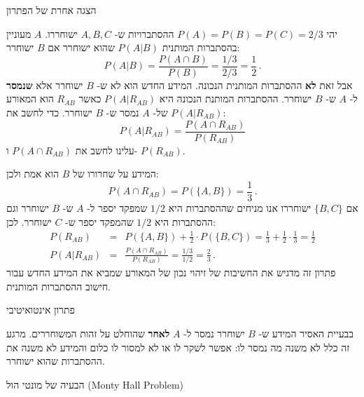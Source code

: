 \documentclass[12pt,a4paper,leqno]{article}
\renewcommand*{\L}[1]{\textenglish{#1}}
\newcommand*{\disfrac}[2]{\displaystyle\frac{#1}{#2}}
\begin{document}
{\bigskip\Large
הצגה אחרת של הפתרון}


יהי 
$P(A)= P(B)=P(C)=2/3$
ההסתברויות ש-%
$A,B,C$
ישוחררו.
$A$
מעוניין בהסתברות המותנית 
$P(A|B)$
שהוא ישוחרר אם 
$B$
ישוחרר:
\[
P(A|B) = \frac{P(A\cap B)}{P(B)} = \frac{1/3}{2/3}=\frac{1}{2}\,.
\]
אבל זאת 
\textbf{לא}
ההסתברות המותנית הנכונה. המידע החדש הוא לא ש-%
$B$
ישוחרר אלא
\textbf{שנמסר}
ל-%
$A$
ש-%
$B$
ישוחרר. ההסתברות המותנת הנכונה היא
$P(A|R_{AB})$
כאשר
$R_{AB}$
הוא המאורע של-%
$A$
נמסר ש-%
$B$
ישוחרר. כדי לחשב את
$P(A|R_{AB})$:
\[
P(A|R_{AB}) = \frac{P(A\cap R_{AB})}{P(R_{AB})}
\]
עלינו לחשב את
$P(A\cap R_{AB})$
ו-%
$P(R_{AB})$.

המידע על שחרורו של
$B$
הוא אמת ולכן:
\[
P(A\cap R_{AB})=P(\{A,B\})=\disfrac{1}{3}\,.
\]
אם 
$\{B,C\}$
ישוחררו אנו מניחים שההסתברות היא
$1/2$
שמפקד יספר ל-%
$A$
ש-%
$B$
ישוחרר וגם ההסתברות היא
$1/2$
שהמפקד יספר ש-%
$C$
ישוחרר. לכן:
\begin{eqnarray*}
P(R_{AB})&=&P(\{A,B\})+\disfrac{1}{2}\cdot P(\{B,C\})=\disfrac{1}{3}+\disfrac{1}{2}\cdot \disfrac{1}{3}=\disfrac{1}{2}\\
P(A|R_{AB}) &=& \frac{P(A\cap R_{AB})}{P(R_{AB})} = \disfrac{1/3}{1/2}=\disfrac{2}{3}\,.
\end{eqnarray*}
פתרון זה מדגיש את החשיבות של זיהוי נכון של המאורע שמביא את המידע החדש עבור חישוב ההסתברות המותנית.

{\bigskip\Large
פתרון אינטואיטיבי}

בבעיית האסיר המידע ש-%
$B$
ישוחרר נמסר ל-%
$A$
\textbf{לאחר}
שהוחלט על זהות המשוחררים. מרגע זה כלל לא משנה מה נמסר לו: אפשר
לשקר לו או לא למסור לו כלום והמידע לא משנה את ההסתברות שהוא ישוחרר.

{\bigskip\Large
הבעיה של מונטי הול 
\L{(Monty Hall Problem)}}
\end{document}
